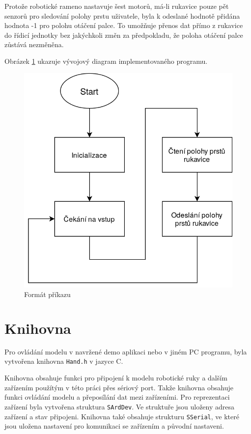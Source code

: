\documentclass[thesis=B,czech]{FITthesis}[2012/06/26]
\begin{document}
Protože robotické rameno nastavuje šest motorů, má-li rukavice pouze pět senzorů pro sledování polohy prstu uživatele, byla k odeslané hodnotě přidána hodnota -1 pro polohu otáčení palce. To umožňuje přenos dat přímo z rukavice do řídicí jednotky bez jakýchkoli změn za předpokladu, že poloha otáčení palce zůstává nezměněna. 

Obrázek \ref{fig:GloveProgDiagr} ukazuje vývojový diagram implementovaného programu.

 \begin{figure}[H]
\centering
\includegraphics[scale=0.35]{./image/GloveProgDiagr.png}
\caption{Formát příkazu}
\label{fig:GloveProgDiagr}
\end{figure} 



\section{Knihovna}

Pro ovládání modelu v navržené demo aplikaci nebo v jiném PC programu, byla vytvořena knihovna \texttt{Hand.h} v jazyce C. 

Knihovna obsahuje funkci pro připojení k modelu robotické ruky a dalším zařízením použítým v této práci přes sériový port. Takže knihovna obsahuje funkci ovládání modelu a přeposílání dat mezi zařízeními. Pro reprezentaci zařízení byla vytvořena struktura \texttt{SArdDev}. Ve struktuře jsou uloženy adresa zařízení a stav připojeni. Knihovna také obsahuje strukturu \texttt{SSerial}, ve které jsou uložena nastavení pro komunikaci se zařízením a původní nastaveni.
\end{document}
